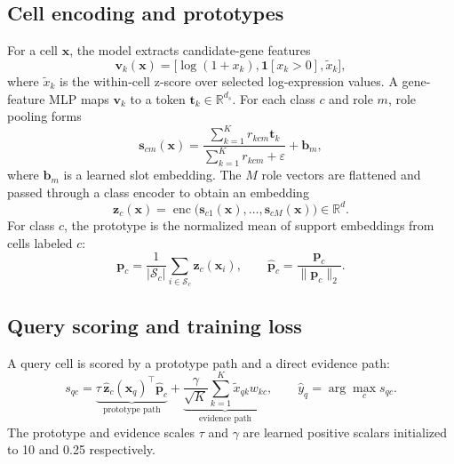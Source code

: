 \documentclass{article}
\newcommand{\R}{\mathbb{R}}
\newcommand{\eps}{\varepsilon}
\begin{document}
\subsection{Cell encoding and prototypes}

For a cell \(\mathbf{x}\), the model extracts candidate-gene features
\begin{equation}
    \mathbf{v}_{k}(\mathbf{x})=\bigl[\log(1+x_k),\mathbf{1}[x_k>0],\tilde{x}_k\bigr],
\end{equation}
where \(\tilde{x}_k\) is the within-cell z-score over selected log-expression values. A gene-feature MLP maps \(\mathbf{v}_k\) to a token \(\mathbf{t}_k\in\R^{d_s}\). For each class \(c\) and role \(m\), role pooling forms
\begin{equation}
    \mathbf{s}_{cm}(\mathbf{x})=\frac{\sum_{k=1}^{K} r_{kcm}\mathbf{t}_k}{\sum_{k=1}^{K}r_{kcm}+\eps}+\mathbf{b}_m,
\end{equation}
where \(\mathbf{b}_m\) is a learned slot embedding. The \(M\) role vectors are flattened and passed through a class encoder to obtain an embedding
\begin{equation}
    \mathbf{z}_c(\mathbf{x})=\operatorname{enc}\bigl(\mathbf{s}_{c1}(\mathbf{x}),\ldots,\mathbf{s}_{cM}(\mathbf{x})\bigr)\in\R^d.
\end{equation}
For class \(c\), the prototype is the normalized mean of support embeddings from cells labeled \(c\):
\begin{equation}
    \mathbf{p}_c=\frac{1}{|\mathcal{S}_c|}\sum_{i\in\mathcal{S}_c}\mathbf{z}_c(\mathbf{x}_i),
    \qquad
    \hat{\mathbf{p}}_c=\frac{\mathbf{p}_c}{\|\mathbf{p}_c\|_2}.
\end{equation}

\subsection{Query scoring and training loss}

A query cell is scored by a prototype path and a direct evidence path:
\begin{equation}
    s_{qc}=\underbrace{\tau\,\hat{\mathbf{z}}_c(\mathbf{x}_q)^\top\hat{\mathbf{p}}_c}_{\text{prototype path}}
    +
    \underbrace{\frac{\gamma}{\sqrt{K}}\sum_{k=1}^{K}\tilde{x}_{qk}w_{kc}}_{\text{evidence path}},
    \qquad
    \hat{y}_q=\arg\max_c s_{qc}.
\end{equation}
The prototype and evidence scales \(\tau\) and \(\gamma\) are learned positive scalars initialized to 10 and 0.25 respectively.
\end{document}
